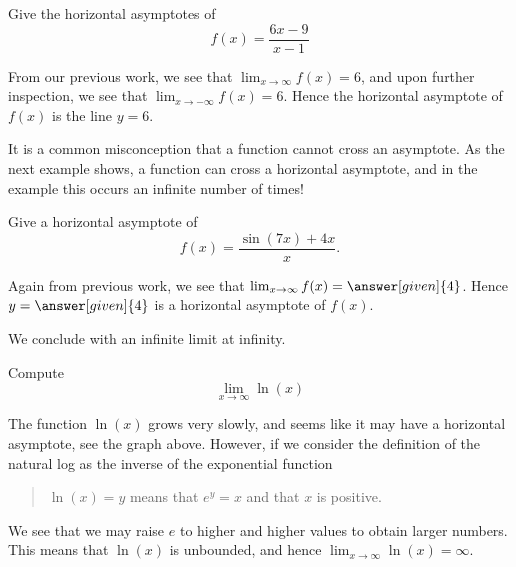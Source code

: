 \documentclass{ximera}
\begin{document}
\begin{example} 
Give the horizontal asymptotes of
\[
f(x) = \frac{6x-9}{x-1}
\]
\begin{explanation}
From our previous work, we see that $\lim_{x\to \infty} f(x) = 6$, and
upon further inspection, we see that $\lim_{x\to -\infty} f(x) =
6$. Hence the horizontal asymptote of $f(x)$ is the line $y=6$.
\end{explanation}
\end{example}


It is a common misconception that a function cannot cross an
asymptote. As the next example shows, a function can cross a horizontal
asymptote, and in the example this occurs an infinite number of times!

\begin{example}
Give a horizontal asymptote of
\[
f(x) = \frac{\sin(7x)+4x}{x}.
\]
\begin{explanation}
Again from previous work, we see that $\lim_{x\to \infty} f(x) =
\answer[given]{4}$. Hence $y=\answer[given]{4}$ is a horizontal asymptote of $f(x)$.
\end{explanation}
\end{example}


We conclude with an infinite limit at infinity.

\begin{example}
Compute
\[
\lim_{x\to \infty} \ln(x)
\]
\begin{image}
\end{image}
\begin{explanation}
The function $\ln(x)$ grows very slowly, and seems like it may have a
horizontal asymptote, see the graph above. However, if we consider the
definition of the natural log as the inverse of the exponential
function
\begin{quote}%
  $\ln(x) = y$ means that $e^y =x$ and that $x$ is positive.
\end{quote}
We see that we may raise $e$ to higher and higher values to obtain
larger numbers.  This means that $\ln(x)$ is unbounded, and hence
$\lim_{x\to\infty}\ln(x)=\infty$.
\end{explanation}
\end{example}
\end{document}
